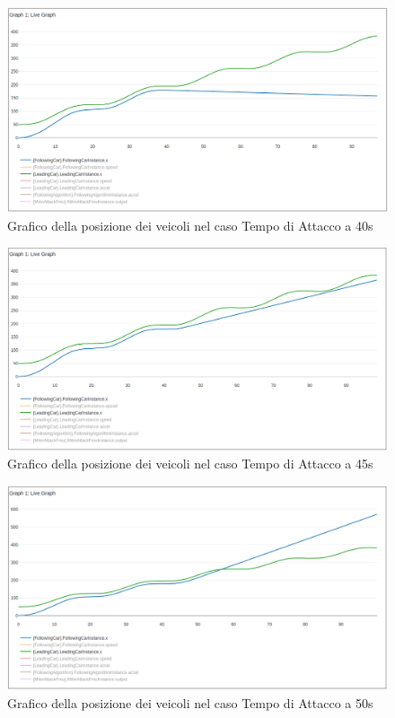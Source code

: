 \begin{figure}[H]
	\centering
	\includegraphics[width=\textwidth]{img/AttackAccel0T40X.png}
	\caption{Grafico della posizione dei veicoli nel caso Tempo di Attacco a 40s}
\end{figure}

\begin{figure}[H]
	\centering
	\includegraphics[width=\textwidth]{img/AttackAccel0T45X.png}
	\caption{Grafico della posizione dei veicoli nel caso Tempo di Attacco a 45s}
\end{figure}

\begin{figure}[H]
	\centering
	\includegraphics[width=\textwidth]{img/AttackAccel0T50X.png}
	\caption{Grafico della posizione dei veicoli nel caso Tempo di Attacco a 50s}
\end{figure}

